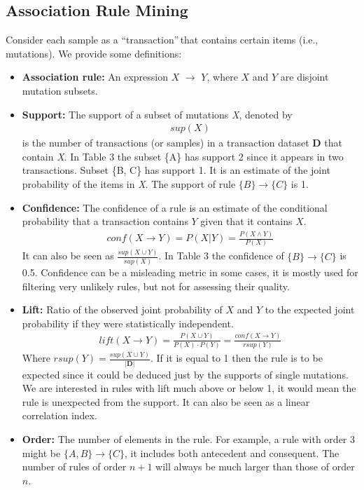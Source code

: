 \documentclass[twoside,twocolumn]{article}
\begin{document}
\subsection{Association Rule Mining}
Consider each sample as a \textquotedblleft transaction\textquotedblright$\,$that contains certain items (i.e., mutations). We provide some definitions:
	\begin{itemize}
		\item \textbf{Association rule:} An expression $X$ $\rightarrow$ $Y$, where $X$ and $Y$ are disjoint mutation subsets. 
		\item \textbf{Support:} The support of a subset of mutations \textit{X}, denoted by 
		\begin{align*}
			sup(X)
		\end{align*} is the number of transactions (or samples) in a transaction dataset \textbf{D} that contain \textit{X}. In Table 3 the subset \{A\} has support 2 since it appears in two transactions. Subset \{B, C\} has support 1. It is an estimate of the joint probability of the items in \textit{X}. The support of rule $\{B\} \rightarrow \{C\}$ is 1.
	\item \textbf{Confidence:} The confidence of a rule is an estimate of the conditional probability that a transaction contains $Y$ given that it contains $X$.
	\begin{align*}
		conf(X \rightarrow Y) = P(X|Y) = \frac{P(X \land Y)}{P(X)}
	\end{align*}
	It can also be seen as $\frac{sup(X \cup Y)}{sup(X)}$. In Table 3 the confidence of $\{B\} \rightarrow \{C\}$ is 0.5. Confidence can be a misleading metric in some cases, it is mostly used for filtering very unlikely rules, but not for assessing their quality.
	\item \textbf{Lift:} Ratio of the observed joint probability of $X$ and $Y$ to the expected joint probability if they were statistically independent.	
	\begin{align*}
		lift(X \rightarrow Y) = \frac{P(X\cup Y)}{P(X)\cdot P(Y)} = \frac{conf(X\rightarrow Y)}{rsup(Y)}
	\end{align*}
    Where $rsup(Y) = \frac{sup(X\cup Y)}{|\mathbf{D}|}$. If it is equal to 1 then the rule is to be expected since it could be deduced just by the supports of single mutations. We are interested in rules with lift much above or below 1, it would mean the rule is unexpected from the support. It can also be seen as a linear correlation index. 
    \item \textbf{Order: } The number of elements in the rule. For example, a rule with order 3 might be $\{A,B\} \rightarrow \{C\}$, it includes both antecedent and consequent. The number of rules of order $n + 1$ will always be much larger than those of order $n$.
	\end{itemize}
\end{document}
